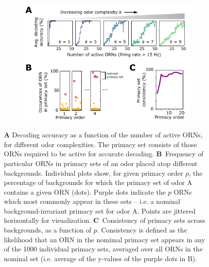 \documentclass[9pt,twocolumn,twoside]{pnas-new}
\begin{document}
\begin{figure}[tb]
	\begin{subfigure}[t]{\linewidth}
		\includegraphics[width=\textwidth]{figures/4_primacy_coding}
		\label{fig:primacy_coding_a}	
	\end{subfigure}
	\begin{subfigure}[t]{0\linewidth}
		\label{fig:primacy_coding_b}
	\end{subfigure}
	\begin{subfigure}[t]{0\linewidth}
		\label{fig:primacy_coding_c}
	\end{subfigure}
	\caption{\footnotesize{
	\textbf{A} Decoding accuracy as a function of the number of active ORNs, for different odor complexities. The primacy set consists of those ORNs required to be active for accurate decoding. %
	\textbf{B}~Frequency of particular ORNs in primacy sets of an odor placed atop different backgrounds. Individual plots show, for given primacy order $p$, the percentage of backgrounds for which the primacy set of odor A contains a given ORN (dots). Purple dots indicate the $p$ ORNs which most commonly appear in these sets -- i.e. a nominal background-invariant primacy set for odor A. Points are jittered horizontally for visualization.
	\textbf{C}~Consistency of primacy sets across backgrounds, as a function of $p$. Consistency is defined as the likelihood that an ORN in the nomimal primacy set appears in any of the 1000 individual primacy sets, averaged over all ORNs in the nominal set (i.e. average of the y-values of the purple dots in B).
	}}
	\label{fig:primacy_coding}
\end{figure}
\end{document}
